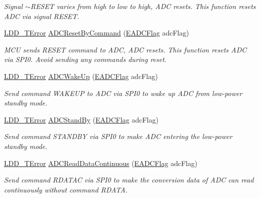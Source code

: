 \begin{DoxyCompactItemize}
\begin{DoxyCompactList}\small\item\em Signal $\sim$\-R\-E\-S\-E\-T varies from high to low to high, A\-D\-C resets. This function resets A\-D\-C via signal R\-E\-S\-E\-T. \end{DoxyCompactList}\item 
\hyperlink{group___p_e___types__module_ga24c2b045fd04e79e85f261ce4df35588}{L\-D\-D\-\_\-\-T\-Error} \hyperlink{group___a_d_c__module_gaa6ed128c952696b046a47a2ae9d3ec1e}{A\-D\-C\-Reset\-By\-Command} (\hyperlink{group___enum_grp_ga7a77f876c6fae36cb97dfc3ba1e07665}{E\-A\-D\-C\-Flag} adc\-Flag)
\begin{DoxyCompactList}\small\item\em M\-C\-U sends R\-E\-S\-E\-T command to A\-D\-C, A\-D\-C resets. This function resets A\-D\-C via S\-P\-I0. Avoid sending any commands during reset. \end{DoxyCompactList}\item 
\hyperlink{group___p_e___types__module_ga24c2b045fd04e79e85f261ce4df35588}{L\-D\-D\-\_\-\-T\-Error} \hyperlink{group___a_d_c__module_gace4858ead7841b0d2b078b5b33573740}{A\-D\-C\-Wake\-Up} (\hyperlink{group___enum_grp_ga7a77f876c6fae36cb97dfc3ba1e07665}{E\-A\-D\-C\-Flag} adc\-Flag)
\begin{DoxyCompactList}\small\item\em Send command W\-A\-K\-E\-U\-P to A\-D\-C via S\-P\-I0 to wake up A\-D\-C from low-\/power standby mode. \end{DoxyCompactList}\item 
\hyperlink{group___p_e___types__module_ga24c2b045fd04e79e85f261ce4df35588}{L\-D\-D\-\_\-\-T\-Error} \hyperlink{group___a_d_c__module_gac1be36a504b6060dd86bb74c0ac9dff3}{A\-D\-C\-Stand\-By} (\hyperlink{group___enum_grp_ga7a77f876c6fae36cb97dfc3ba1e07665}{E\-A\-D\-C\-Flag} adc\-Flag)
\begin{DoxyCompactList}\small\item\em Send command S\-T\-A\-N\-D\-B\-Y via S\-P\-I0 to make A\-D\-C entering the low-\/power standby mode. \end{DoxyCompactList}\item 
\hyperlink{group___p_e___types__module_ga24c2b045fd04e79e85f261ce4df35588}{L\-D\-D\-\_\-\-T\-Error} \hyperlink{group___a_d_c__module_ga006599cf1a3384ae5bab076c52b99db8}{A\-D\-C\-Read\-Data\-Continuous} (\hyperlink{group___enum_grp_ga7a77f876c6fae36cb97dfc3ba1e07665}{E\-A\-D\-C\-Flag} adc\-Flag)
\begin{DoxyCompactList}\small\item\em Send command R\-D\-A\-T\-A\-C via S\-P\-I0 to make the conversion data of A\-D\-C can read continuously without command R\-D\-A\-T\-A. \end{DoxyCompactList}\item 

\end{DoxyCompactItemize}
